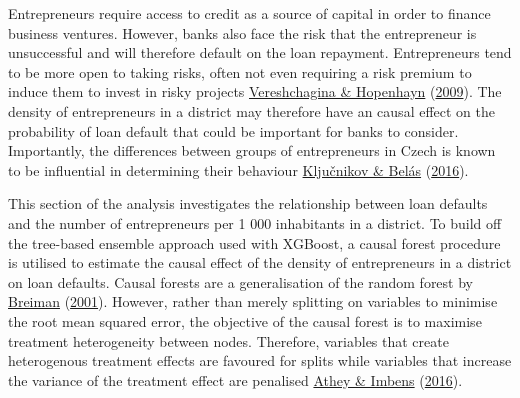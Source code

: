 \documentclass[11pt,preprint, authoryear]{elsarticle}
\numberwithin{equation}{section}
\numberwithin{figure}{section}
\numberwithin{table}{section}
\begin{document}
Entrepreneurs require access to credit as a source of capital in order
to finance business ventures. However, banks also face the risk that the
entrepreneur is unsuccessful and will therefore default on the loan
repayment. Entrepreneurs tend to be more open to taking risks, often not
even requiring a risk premium to induce them to invest in risky projects
\protect\hyperlink{ref-Risk}{Vereshchagina \& Hopenhayn}
(\protect\hyperlink{ref-Risk}{2009}). The density of entrepreneurs in a
district may therefore have an causal effect on the probability of loan
default that could be important for banks to consider. Importantly, the
differences between groups of entrepreneurs in Czech is known to be
influential in determining their behaviour
\protect\hyperlink{ref-Entrep}{Ključnikov \& Belás}
(\protect\hyperlink{ref-Entrep}{2016}).

This section of the analysis investigates the relationship between loan
defaults and the number of entrepreneurs per 1 000 inhabitants in a
district. To build off the tree-based ensemble approach used with
XGBoost, a causal forest procedure is utilised to estimate the causal
effect of the density of entrepreneurs in a district on loan defaults.
Causal forests are a generalisation of the random forest by
\protect\hyperlink{ref-Breiman2001}{Breiman}
(\protect\hyperlink{ref-Breiman2001}{2001}). However, rather than merely
splitting on variables to minimise the root mean squared error, the
objective of the causal forest is to maximise treatment heterogeneity
between nodes. Therefore, variables that create heterogenous treatment
effects are favoured for splits while variables that increase the
variance of the treatment effect are penalised
\protect\hyperlink{ref-AtheyImbensRecursive}{Athey \& Imbens}
(\protect\hyperlink{ref-AtheyImbensRecursive}{2016}).
\end{document}
